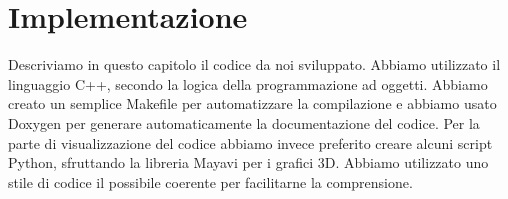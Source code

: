 \documentclass[oneside,12pt]{book}  %
\theoremstyle{plain}
\theoremstyle{definition}
\theoremstyle{remark}
\numberwithin{equation}{chapter} %
\begin{document}


\chapter{Implementazione}
\label{ch:implementazione}

Descriviamo in questo capitolo il codice da noi sviluppato. Abbiamo
utilizzato il linguaggio C++, secondo la logica della programmazione
ad oggetti. Abbiamo creato un semplice Makefile per automatizzare la
compilazione e abbiamo usato Doxygen per generare automaticamente la
documentazione del codice.
Per la parte di visualizzazione del codice abbiamo invece preferito
creare alcuni script Python, sfruttando la libreria Mayavi per i
grafici 3D.
Abbiamo utilizzato uno stile di codice il possibile coerente per
facilitarne la comprensione.
\end{document}

